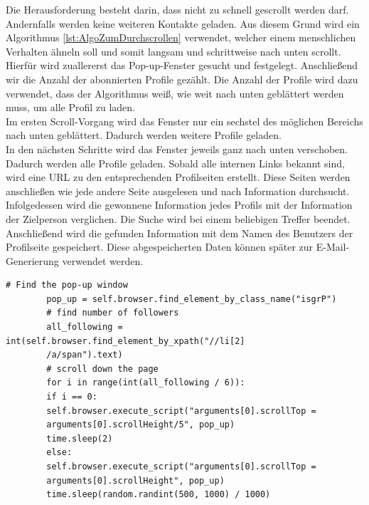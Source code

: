 		Die Herausforderung besteht darin, dass nicht zu schnell gescrollt werden darf. Andernfalls werden keine weiteren Kontakte geladen. Aus diesem Grund wird ein Algorithmus \ref{lst:AlgoZumDurchscrollen} verwendet, welcher einem menschlichen Verhalten ähneln soll und somit langsam und schrittweise nach unten scrollt. Hierfür wird zuallererst das Pop-up-Fenster gesucht und festgelegt. Anschließend wir die Anzahl der abonnierten Profile gezählt. Die Anzahl der Profile wird dazu verwendet, dass der Algorithmus weiß, wie weit nach unten geblättert werden muss, um alle Profil zu laden.\\
		Im ersten Scroll-Vorgang wird das Fenster nur ein sechstel des möglichen Bereichs nach unten geblättert. Dadurch werden weitere Profile geladen.\\
		In den nächsten Schritte wird das Fenster jeweils ganz nach unten verschoben. Dadurch werden alle Profile geladen. Sobald alle internen Links bekannt sind, wird eine URL zu den entsprechenden Profilseiten erstellt. Diese Seiten werden anschließen wie jede andere Seite ausgelesen und nach Information durchsucht. Infolgedessen wird die gewonnene Information jedes Profils mit der Information der Zielperson verglichen. Die Suche wird bei einem beliebigen Treffer beendet. Anschließend wird die gefunden Information mit dem Namen des Benutzers der Profilseite gespeichert. Diese abgespeicherten Daten können später zur E-Mail-Generierung verwendet werden.\\
		
		\begin{lstlisting}[caption=Herunterscrollen des Pop-up Fensters,label={lst:AlgoZumDurchscrollen}]
		# Find the pop-up window
		pop_up = self.browser.find_element_by_class_name("isgrP")        
		# find number of followers
		all_following = int(self.browser.find_element_by_xpath("//li[2]
		/a/span").text)
		# scroll down the page
		for i in range(int(all_following / 6)):
		if i == 0:
		self.browser.execute_script("arguments[0].scrollTop = 
		arguments[0].scrollHeight/5", pop_up)
		time.sleep(2)
		else:
		self.browser.execute_script("arguments[0].scrollTop = 
		arguments[0].scrollHeight", pop_up)
		time.sleep(random.randint(500, 1000) / 1000)
		\end{lstlisting}	
		
